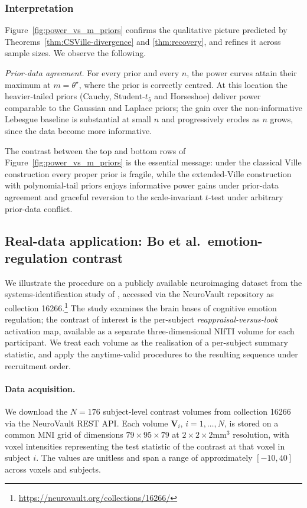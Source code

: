 \documentclass{article}%
\newcommand{\1}{\mathbf{1}}
\begin{document}
\subsubsection{Interpretation}\label{ssec:exp-interp}

Figure~\ref{fig:power_vs_m_priors} confirms the qualitative picture
predicted by Theorems~\ref{thm:CSVille-divergence} and \ref{thm:recovery}, and refines it across sample sizes. We observe the following.

\emph{Prior-data agreement.} For every prior and every \(n\), the power
curves attain their maximum at \(m=\theta^\star\), where the prior is
correctly centred. At this location the heavier-tailed priors (Cauchy, Student-$t_5$ and Horseshoe) deliver power comparable to the Gaussian and Laplace priors;
the gain over the non-informative Lebesgue baseline is substantial at
small \(n\) and progressively erodes as \(n\) grows, since the data become more informative.

The contrast between the top and bottom rows of Figure~\ref{fig:power_vs_m_priors} is the essential message: under the classical Ville construction every proper prior is fragile, while the
extended-Ville construction with polynomial-tail priors enjoys
informative power gains under prior-data agreement and graceful reversion to the scale-invariant \(t\)-test under arbitrary prior-data conflict.



\subsection{Real-data application: Bo et al.\ emotion-regulation contrast}
\label{sec:neurovault}
We illustrate the procedure on a publicly available neuroimaging dataset from
the systems-identification study of \cite{bo2024systems}, accessed via the
NeuroVault repository \citep{gorgolewski2015neurovault} as collection
\textsc{16266}.\footnote{\url{https://neurovault.org/collections/16266/}} The
study examines the brain bases of cognitive emotion regulation; the
contrast of interest is the per-subject \emph{reappraisal-versus-look}
activation map, available as a separate three-dimensional NIfTI volume for
each participant. We treat each volume as the realisation of a per-subject
summary statistic, and apply the anytime-valid procedures to the resulting
sequence under recruitment order.

\paragraph{Data acquisition.}
We download the $N = 176$ subject-level contrast volumes from collection \textsc{16266} via the NeuroVault REST API. Each volume $\mathbf{V}_i$, $i = 1,\ldots,N$, is stored on a common MNI grid of dimensions
$79 \times 95 \times 79$ at $2 \times 2 \times 2 \mathrm{mm}^3$ resolution, with voxel intensities representing the test statistic of the contrast at that voxel in subject $i$. The values are unitless and span a range of
approximately $[-10, 40]$ across voxels and subjects.
\end{document}
